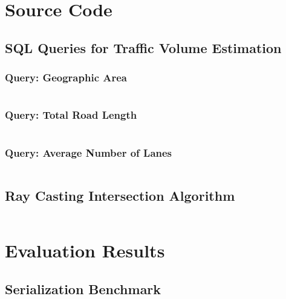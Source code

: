 \chapter{Source Code}
\label{appendix:source_code}

\section{SQL Queries for Traffic Volume Estimation}
\label{sec:appendix:source_code:traffic_volume}

\subsection{Query: Geographic Area}
\inputminted[fontsize=\footnotesize]{sql}{97_listings/traffic_volume_1.sql}

\subsection{Query: Total Road Length}
\inputminted[fontsize=\footnotesize]{sql}{97_listings/traffic_volume_2.sql}

\subsection{Query: Average Number of Lanes}
\inputminted[fontsize=\footnotesize]{sql}{97_listings/traffic_volume_3.sql}

\section{Ray Casting Intersection Algorithm}
\label{sec:appendix:source_code:ray_casting_intersection_algorithm}
\inputminted[fontsize=\footnotesize]{c++}{97_listings/raycast.cu}

\chapter{Evaluation Results}
\section{Serialization Benchmark}
\label{sec:appendix:evaluation_results:serialization_benchmark}
\inputminted[fontsize=\small]{text}{97_listings/serialization_evaluation.txt}